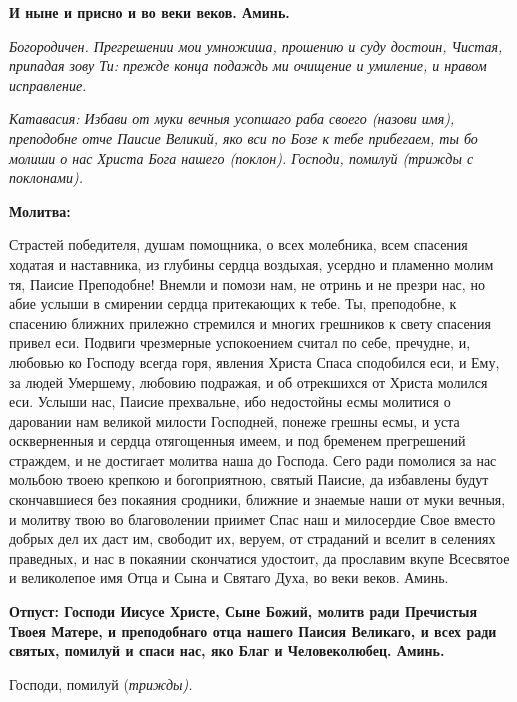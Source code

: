 \bfseries И ныне и присно и во веки веков. Аминь\normalfont{}. 




\itshape Богородичен.\normalfont{} Прегрешении мои умножиша, прошению и суду достоин, Чистая, припадая зову Ти: прежде конца подаждь ми очищение и умиление, и нравом исправление.




\itshape Катавасия:\normalfont{} Избави от муки вечныя усопшаго раба своего (\itshape назови имя\normalfont{}), преподобне отче Паисие Великий, яко вси по Бозе к тебе прибегаем, ты бо молиши о нас Христа Бога нашего (\itshape поклон\normalfont{}). Господи, помилуй (\itshape трижды с поклонами\normalfont{}). 







\bfseries Молитва:\normalfont{}\nopagebreak



Страстей победителя, душам помощника, о всех молебника, всем спасения ходатая и наставника, из глубины сердца воздыхая, усердно и пламенно молим тя, Паисие Преподобне! Внемли и помози нам, не отринь и не презри нас, но абие услыши в смирении сердца притекающих к тебе. Ты, преподобне, к спасению ближних прилежно стремился и многих грешников к свету спасения привел еси. Подвиги чрезмерные успокоением считал по себе, пречудне, и, любовью ко Господу всегда горя, явления Христа Спаса сподобился еси, и Ему, за людей Умершему, любовию подражая, и об отрекшихся от Христа молился еси. Услыши нас, Паисие прехвальне, ибо недостойны есмы молитися о даровании нам великой милости Господней, понеже грешны есмы, и уста оскверненныя и сердца отягощенныя имеем, и под бременем прегрешений страждем, и не достигает молитва наша до Господа. Сего ради помолися за нас мольбою твоею крепкою и богоприятною, святый Паисие, да избавлены будут скончавшиеся без покаяния сродники, ближние и знаемые наши от муки вечныя, и молитву твою во благоволении приимет Спас наш и милосердие Свое вместо добрых дел их даст им, свободит их, веруем, от страданий и вселит в селениях праведных, и нас в покаянии скончатися удостоит, да прославим вкупе Всесвятое и великолепое имя Отца и Сына и Святаго Духа, во веки веков. Аминь. 




\bfseries Отпуст:\normalfont{}\nopagebreak
Господи Иисусе Христе, Сыне Божий, молитв ради Пречистыя Твоея Матере, и преподобнаго отца нашего Паисия Великаго, и всех ради святых, помилуй и спаси нас, яко Благ и Человеколюбец. Аминь. 


Господи, помилуй (\itshape трижды\normalfont{}). 